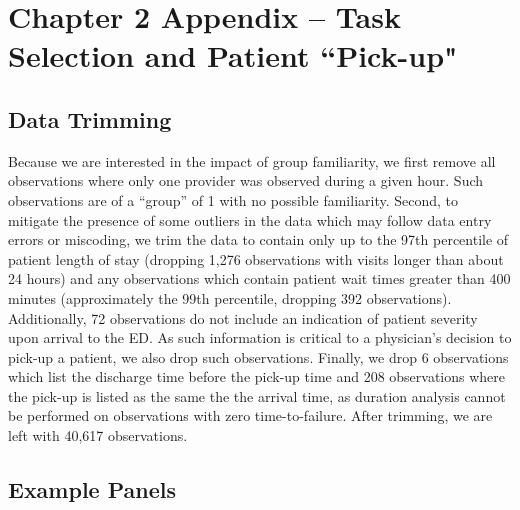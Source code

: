 \chapter{Chapter 2 Appendix -- Task Selection and Patient ``Pick-up"}

\section{Data Trimming} \label{app_pu_Trim}
 Because we are interested in the impact of group familiarity, we first remove all observations where only one provider was observed during a given hour. Such observations are of a “group” of 1 with no possible familiarity. Second, to mitigate the presence of some outliers in the data which may follow data entry errors or miscoding, we trim the data to contain only up to the 97th percentile of patient length of stay (dropping 1,276 observations with visits longer than about 24 hours) and any observations which contain patient wait times greater than 400 minutes (approximately the 99th percentile, dropping 392 observations). Additionally, 72 observations do not include an indication of patient severity upon arrival to the ED. As such information is critical to a physician’s decision to pick-up a patient, we also drop such observations. Finally, we drop 6 observations which list the discharge time before the pick-up time and 208 observations where the pick-up is listed as the same the the arrival time, as duration analysis cannot be performed on observations with zero time-to-failure. After trimming, we are left with 40,617 observations. 
 

\section{Example Panels} \label{app_pu_examples}

